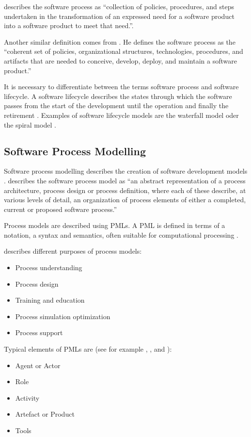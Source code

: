 \cite{McChesney:1995aa} describes the software process as ``collection of policies, procedures, and steps undertaken in the transformation of an expressed need for a software product into a software product to meet that need.''.

Another similar definition comes from \cite{Fuggetta:2000ds}. He defines the software process as the ``coherent set of policies, organizational structures, technologies, procedures, and artifacts that are needed to conceive, develop, deploy, and maintain a software product.''

It is necessary to differentiate between the terms software process and software lifecycle. A software lifecycle describes the states through which the software passes from the start of the development until the operation and finally the retirement \citep{Acuna:aa}. 
Examples of software lifecycle models are the waterfall model \citep{Royce:1987tl} oder the spiral model \citep{Boehm:1988cd}.

\subsection{Software Process Modelling}
Software process modelling describes the creation of software development models \citep{Acuna:2001aa}. \cite{Feiler:1993aa} describes the software process model as ``an abstract representation  of a process architecture, process design or process definition, where each of these describe, at various levels of detail, an organization of process elements of either a completed, current or proposed software process.''

Process models are described using \acp{PML}. A \ac{PML} is defined in terms of a notation, a syntax and semantics, often suitable for computational processing \citep{Bendraou:2005dv}.

\cite{Fuggetta:2000ds} describes different purposes of process models:
\begin{itemize}
	\item Process understanding
	\item Process design
	\item Training and education
	\item Process simulation  optimization
	\item Process support
\end{itemize}

Typical elements of \acp{PML} are (see for example \cite{Benali:1992gq}, \cite{Acuna:2001aa}, \cite{Fuggetta:2000ds} and \cite{Curtis:1992kf}):
\begin{itemize}
	\item Agent or Actor
	\item Role
	\item Activity
	\item Artefact or Product
	\item Tools 
\end{itemize}

